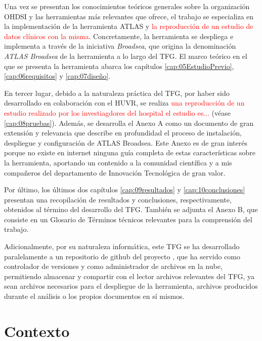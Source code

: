 Una vez se presentan los conocimientos teóricos generales sobre la organización OHDSI y las herramientas más relevantes que ofrece, el trabajo se especializa en la implementación de la herramienta ATLAS y \textcolor{red}{la reproducción de un estudio de datos clínicos con la misma}. Concretamente, la herramienta se despliega e implementa a través de la iniciativa \textit{Broadsea}, que origina la denominación \textit{ATLAS Broadsea} de la herramienta a lo largo del TFG. El marco teórico en el que se presenta la herramienta abarca los capítulos \ref{cap:05EstudioPrevio}, \ref{cap:06requisitos} y \ref{cap:07diseño}.

En tercer lugar, debido a la naturaleza práctica del TFG, por haber sido desarrollado en colaboración con el HUVR, se realiza \textcolor{red}{una reproducción de un estudio realizado por los investiagdores del hospital el estudio es...} (véase \ref{cap:08pruebas}). Además, se desarrolla el Anexo A como un documento de gran extensión y relevancia que describe en profundidad el proceso de instalación, despliegue y configuración de ATLAS Broadsea. Este Anexo es de gran interés porque no existe en internet ninguna guía completa de estas características sobre la herramienta, aportando un contenido a la comunidad científica y a mis compañeros del departamento de Innovación Tecnológica de gran valor.

Por último, los últimos dos capítulos \ref{cap:09resultados} y \ref{cap:10conclusiones} presentan una recopilación de resultados y conclusiones, respectivamente, obtenidos al término del desarrollo del TFG. También se adjunta el Anexo B, que consiste en un Glosario de Términos técnicos relevantes para la comprensión del trabajo. 

Adicionalmente, por su naturaleza informática, este TFG se ha desarrollado paralelamente a un repositorio de github del proyecto \cite{vallealonsodc}, que ha servido como controlador de versiones y como administrador de archivos en la nube, permitiendo almacenar y compartir con el lector archivos relevantes del TFG, ya sean archivos necesarios para el despliegue de la herramienta, archivos producidos durante el análisis o los propios documentos en sí mismos.

\section{Contexto} \label{sec:01Contexto} 

